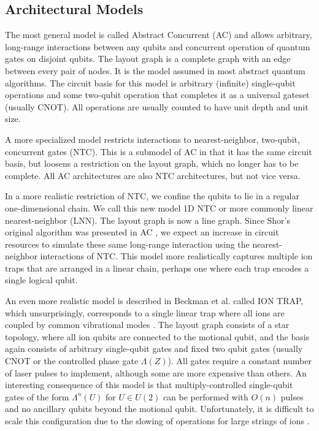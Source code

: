 \subsection{Architectural Models}
\label{subsec:models}

The most general model is called Abstract Concurrent (\textsf{AC})
and allows arbitrary, long-range interactions between any qubits and concurrent
operation of quantum gates on disjoint qubits.
The layout graph is a complete graph with an edge between every pair of nodes.
It is the model assumed in most abstract quantum algorithms. 
The circuit basis
for this model is arbitrary (infinite) single-qubit operations and some
two-qubit operation that completes it as a universal gateset (usually CNOT).
All operations are usually counted to have unit depth and unit size.

A more specialized model restricts interactions to nearest-neighbor, two-qubit,
concurrent gates (\textsf{NTC}). This is a submodel of \textsf{AC} in that it
has the same circuit basis, but loosens a restriction on the layout graph,
which no longer has to be complete. All \textsf{AC} architectures
are also \textsf{NTC} architectures, but not vice versa.

In a more realistic restriction of \textsf{NTC}, we confine the qubits to
lie in a regular one-dimensional chain. We call this new model
\textsf{1D NTC} or more commonly
linear nearest-neighbor (\textsf{LNN}).
The layout graph is now a line graph.
Since Shor's original algorithm was
presented in \textsf{AC} \cite{Shor1994}, we expect an increase in circuit resources to
simulate these same long-range interaction using the nearest-neighbor
interactions of \textsf{NTC}. This model more realistically captures multiple
ion traps that are arranged in a linear chain, perhaps one where each
trap encodes a single logical qubit.

An even more realistic model is described in Beckman et al.
\cite{Beckman1996} called \textsf{ION TRAP}, which unsurprisingly,
corresponds to a single linear trap where all ions are coupled by
common vibrational modes \cite{Cirac1995}.
The layout graph consists of a star topology,
where all ion qubits are connected to the motional qubit, and the basis
again consists of arbitrary single-qubit gates and fixed two qubit
gates (usually CNOT or the controlled phase gate $\Lambda(Z)$).
All gates require
a constant number of laser pulses to implement, although some are more
expensive than others. An interesting consequence of this model is that
multiply-controlled single-qubit gates of the form $\Lambda^n(U)$ for
$U \in U(2)$ can be performed with $O(n)$ pulses and no ancillary qubits
beyond the motional qubit. Unfortunately, it is difficult to scale
this configuration due to the slowing of operations for large strings of
ions \cite{Haffner2008}.

